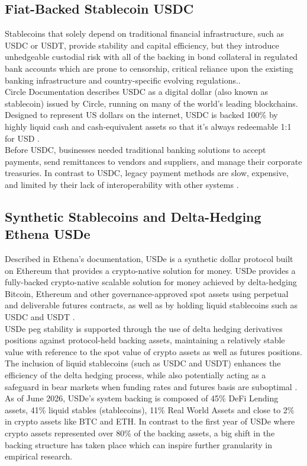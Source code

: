 \documentclass[12pt,a4paper,titlepage,oneside,english]{article}
\begin{document}
\subsection{Fiat-Backed Stablecoin USDC} %
Stablecoins that solely depend on traditional financial infrastructure, such as USDC or USDT, provide stability and capital efficiency, but they introduce unhedgeable custodial risk with all of the backing in bond collateral in regulated bank accounts which are prone to censorship, critical reliance upon the existing banking infrastructure and country-specific evolving regulations.\parencite{ethena_docs}.\\
Circle Documentation \parencite{circle_docs} describes USDC as a digital dollar (also known as stablecoin) issued by Circle, running on many of the world’s leading blockchains. Designed to represent US dollars on the internet, USDC is backed 100\% by highly liquid cash and cash-equivalent assets so that it’s always redeemable 1:1 for USD .\\
Before USDC, businesses needed traditional banking solutions to accept payments, send remittances to vendors and suppliers, and manage their corporate treasuries. In contrast to USDC, legacy payment methods are slow, expensive, and limited by their lack of interoperability with other systems \parencite{circle_docs}.\\ 

\subsection{Synthetic Stablecoins and Delta-Hedging Ethena USDe}
Described in Ethena's documentation, USDe is a synthetic dollar protocol built on Ethereum that provides a crypto-native solution for money. USDe provides a fully-backed crypto-native scalable solution for money achieved by delta-hedging Bitcoin, Ethereum and other governance-approved spot assets using perpetual and deliverable futures contracts, as well as by holding liquid stablecoins such as USDC and USDT \parencite{ethena_docs}. \\
USDe peg stability is supported through the use of delta hedging derivatives positions against protocol-held backing assets, maintaining a relatively stable value with reference to the spot value of crypto assets as well as futures positions. The inclusion of liquid stablecoins (such as USDC and USDT) enhances the efficiency of the delta hedging process, while also potentially acting as a safeguard in bear markets when funding rates and futures basis are suboptimal \parencite{ethena_docs}. As of June 2026, USDe's system backing is composed of 45\% DeFi Lending assets, 41\% liquid stables (stablecoins), 11\% Real World Assets and close to 2\% in crypto assets like BTC and ETH. In contrast to the first year of USDe where crypto assets represented over 80\% of the backing assets, a big shift in the backing structure has taken place which can inspire further granularity in empirical research.
\end{document}
